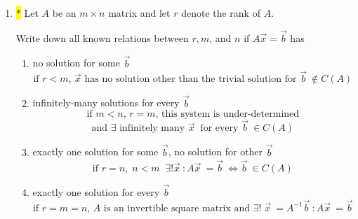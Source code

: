 \documentclass[12pt]{article}
\begin{document}
\begin{enumerate}
\begin{enumerate}
\end{enumerate}







\item  \colorbox{yellow}{$\ast$}  Let $A$ be an $m \times n$ matrix and let $r$ denote the rank of $A$.

Write down all known relations between $r, m$, and $n$ if $A\vec x = \vec b$ has
	\begin{enumerate}
	\item no solution for some $\vec b$\\
        \[
        \text{if $r<m$, $\vec x$ has no solution other than the trivial solution for $\vec b\ \notin C(A)$}
        \]
	\item infinitely-many solutions for every $\vec b$
        \[
        \text{if $m<n$, $r=m$, this system is under-determined} \]\[
        \text{and $\exists$ infinitely many $\vec x\ $ for every $\vec b\ \in C(A)$}
        \]
	\item exactly one solution for some $\vec b$, no solution for other $\vec b$
        \[
        \text{if $r=n,\; n<m$}\;\; \exists! \vec x\ : A\vec x\ = \vec b\ \iff \vec b\ \in C(A)
        \]
	\item exactly one solution for every $\vec b$
        \[
        \text{if $r=m=n$, $A$ is an invertible square matrix and $\exists!\; \vec x\ =A^{-1}\vec b\  : A\vec x\ = \vec b$}
        \]
	\end{enumerate}

\end{enumerate}
\end{document}
